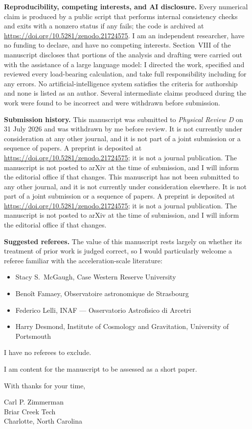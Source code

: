 \documentclass[11pt]{article}
\begin{document}
\vspace{0.6em}
\noindent\textbf{Reproducibility, competing interests, and AI disclosure.}
Every numerical claim is produced by a public script that performs internal consistency checks and exits
with a nonzero status if any fails; the code is archived at
\url{https://doi.org/10.5281/zenodo.21724575}. I am an independent researcher, have no funding to declare,
and have no competing interests. Section~VIII of the manuscript discloses that portions of the analysis
and drafting were carried out with the assistance of a large language model: I directed the work,
specified and reviewed every load-bearing calculation, and take full responsibility including for any
errors. No artificial-intelligence system satisfies the criteria for authorship and none is listed as an
author. Several intermediate claims produced during the work were found to be incorrect and were withdrawn
before submission.

\vspace{0.6em}
\noindent\textbf{Submission history.}
\ifprdwithdrawn
This manuscript was submitted to \textit{Physical Review D} on 31 July 2026 and was withdrawn by me before
review. It is not currently under consideration at any other journal, and it is not part of a joint
submission or a sequence of papers. A preprint is deposited at
\url{https://doi.org/10.5281/zenodo.21724575}; it is not a journal publication. The manuscript is not
posted to arXiv at the time of submission, and I will inform the editorial office if that changes.
\else
This manuscript has not been submitted to any other journal, and it is not currently under consideration
elsewhere. It is not part of a joint submission or a sequence of papers. A preprint is deposited at
\url{https://doi.org/10.5281/zenodo.21724575}; it is not a journal publication. The manuscript is not
posted to arXiv at the time of submission, and I will inform the editorial office if that changes.
\fi

\vspace{0.6em}
\noindent\textbf{Suggested referees.}
The value of this manuscript rests largely on whether its treatment of prior work is judged correct, so I
would particularly welcome a referee familiar with the acceleration-scale literature:
\begin{itemize}
\item Stacy S.\ McGaugh, Case Western Reserve University
\item Beno\^it Famaey, Observatoire astronomique de Strasbourg
\item Federico Lelli, INAF --- Osservatorio Astrofisico di Arcetri
\item Harry Desmond, Institute of Cosmology and Gravitation, University of Portsmouth
\end{itemize}
I have no referees to exclude.

\vspace{0.6em}
\noindent
I am content for the manuscript to be assessed as a short paper.

\vspace{1.2em}
\noindent With thanks for your time,

\vspace{1.4em}
\noindent Carl P. Zimmerman\\
Briar Creek Tech\\
Charlotte, North Carolina
\end{document}

